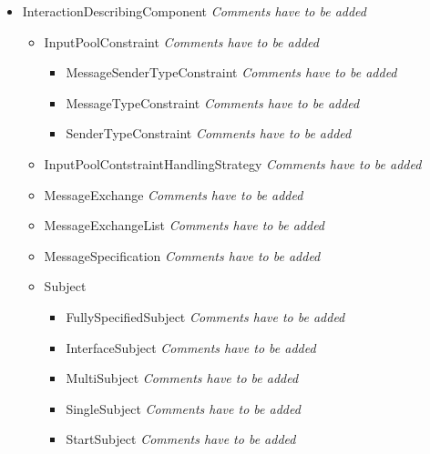 \begin{itemize}
\begin{itemize}
\begin{itemize}
\begin{itemize}
		\end{itemize}
	\end{itemize}
	\item InteractionDescribingComponent \linebreak \textit{Comments have to be added}
	\begin{itemize}
		\item InputPoolConstraint \linebreak \textit{Comments have to be added}
		\begin{itemize}
			\item MessageSenderTypeConstraint \linebreak \textit{Comments have to be added}
			\item MessageTypeConstraint \linebreak \textit{Comments have to be added}
			\item SenderTypeConstraint \linebreak \textit{Comments have to be added}
		\end{itemize}
		\item InputPoolContstraintHandlingStrategy \linebreak \textit{Comments have to be added}
		\item MessageExchange \linebreak \textit{Comments have to be added}
		\item MessageExchangeList \linebreak \textit{Comments have to be added}
		\item MessageSpecification \linebreak \textit{Comments have to be added}
		\item Subject
		\begin{itemize}
			\item FullySpecifiedSubject \linebreak \textit{Comments have to be added}
			\item InterfaceSubject \linebreak \textit{Comments have to be added}
			\item MultiSubject \linebreak \textit{Comments have to be added}
			\item SingleSubject \linebreak \textit{Comments have to be added}
			\item StartSubject \linebreak \textit{Comments have to be added}
		\end{itemize}
	\end{itemize}
				

\end{itemize}
\end{itemize}
